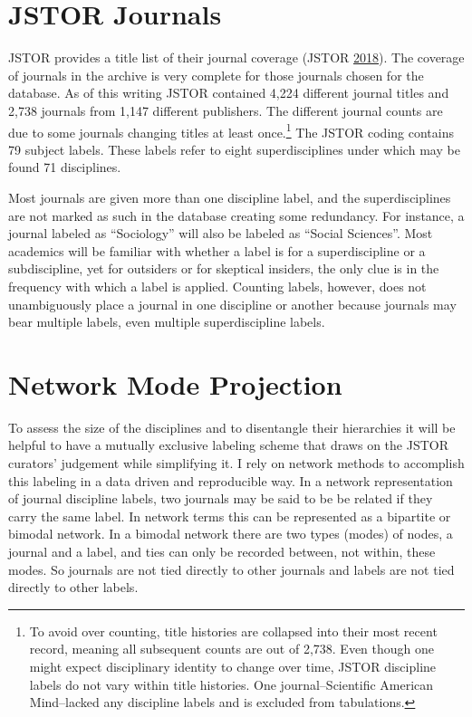 \documentclass[]{book}
\let\rmarkdownfootnote\footnote%
\def\footnote{\protect\rmarkdownfootnote}
\theoremstyle{definition}
\theoremstyle{definition}
\theoremstyle{definition}
\theoremstyle{remark}
\begin{document}
\hypertarget{kd-dq1}{%
\section{JSTOR Journals}\label{kd-dq1}}

JSTOR provides a title list of their journal coverage (JSTOR
\protect\hyperlink{ref-JSTOR2018Title}{2018}). The coverage of journals
in the archive is very complete for those journals chosen for the
database. As of this writing JSTOR contained 4,224 different journal
titles and 2,738 journals from 1,147 different publishers. The different
journal counts are due to some journals changing titles at least
once.\footnote{To avoid over counting, title histories are collapsed
  into their most recent record, meaning all subsequent counts are out
  of 2,738. Even though one might expect disciplinary identity to change
  over time, JSTOR discipline labels do not vary within title histories.
  One journal--Scientific American Mind--lacked any discipline labels
  and is excluded from tabulations.} The JSTOR coding contains 79
subject labels. These labels refer to eight superdisciplines under which
may be found 71 disciplines.

Most journals are given more than one discipline label, and the
superdisciplines are not marked as such in the database creating some
redundancy. For instance, a journal labeled as ``Sociology'' will also
be labeled as ``Social Sciences''. Most academics will be familiar with
whether a label is for a superdiscipline or a subdiscipline, yet for
outsiders or for skeptical insiders, the only clue is in the frequency
with which a label is applied. Counting labels, however, does not
unambiguously place a journal in one discipline or another because
journals may bear multiple labels, even multiple superdiscipline labels.

\hypertarget{network-mode-projection}{%
\section{Network Mode Projection}\label{network-mode-projection}}

To assess the size of the disciplines and to disentangle their
hierarchies it will be helpful to have a mutually exclusive labeling
scheme that draws on the JSTOR curators' judgement while simplifying it.
I rely on network methods to accomplish this labeling in a data driven
and reproducible way. In a network representation of journal discipline
labels, two journals may be said to be be related if they carry the same
label. In network terms this can be represented as a bipartite or
bimodal network. In a bimodal network there are two types (modes) of
nodes, a journal and a label, and ties can only be recorded between, not
within, these modes. So journals are not tied directly to other journals
and labels are not tied directly to other labels.
\end{document}
